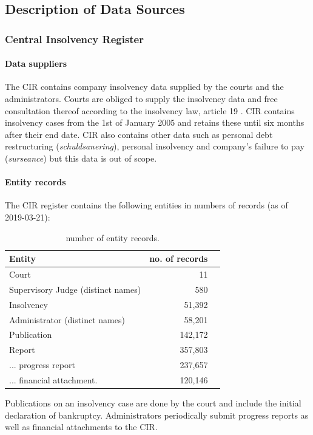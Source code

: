 \subsection{Description of Data Sources}
\subsubsection{Central Insolvency Register}
\paragraph{Data suppliers}
The CIR contains company insolvency data supplied by the courts and the administrators. Courts are obliged to supply the insolvency data and free consultation thereof according to the insolvency law, article 19 \cite{law:1}. CIR contains insolvency cases from the 1st of January 2005 and retains these until six months after their end date. CIR also contains other data such as personal debt restructuring (\textit{schuldsanering}), personal insolvency and company's failure to pay (\textit{surseance}) but this data is out of scope.

\paragraph{Entity records}
The CIR register contains the following entities in numbers of records (as of 2019-03-21):

\begin{table}[h]
\caption{number of entity records.}
\centering
\begin{tabular}{l r r}
\hline\hline
Entity & no. of records\\
\hline
Court & 11 \\
Supervisory Judge (distinct names) & 580 \\
Insolvency & 51,392 \\
Administrator (distinct names) & 58,201 \\
Publication & 142,172 \\
Report & 357,803 \\
... progress report & 237,657 \\
... financial attachment. & 120,146 \\
\hline
\end{tabular}
\label{table:cir_contents}
\end{table}

Publications on an insolvency case are done by the court and include the initial declaration of bankruptcy. Administrators periodically submit progress reports as well as financial attachments to the CIR.

